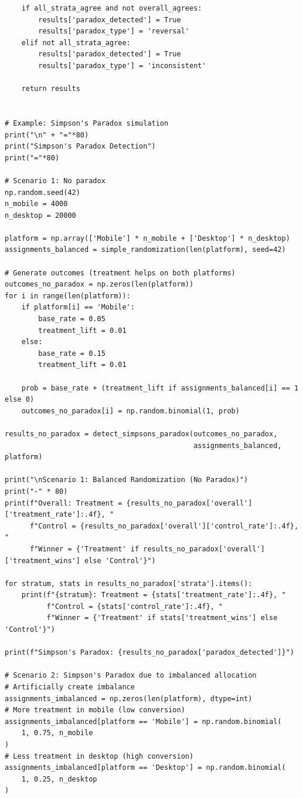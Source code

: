 \begin{lstlisting}
    if all_strata_agree and not overall_agrees:
        results['paradox_detected'] = True
        results['paradox_type'] = 'reversal'
    elif not all_strata_agree:
        results['paradox_detected'] = True
        results['paradox_type'] = 'inconsistent'

    return results


# Example: Simpson's Paradox simulation
print("\n" + "="*80)
print("Simpson's Paradox Detection")
print("="*80)

# Scenario 1: No paradox
np.random.seed(42)
n_mobile = 4000
n_desktop = 20000

platform = np.array(['Mobile'] * n_mobile + ['Desktop'] * n_desktop)
assignments_balanced = simple_randomization(len(platform), seed=42)

# Generate outcomes (treatment helps on both platforms)
outcomes_no_paradox = np.zeros(len(platform))
for i in range(len(platform)):
    if platform[i] == 'Mobile':
        base_rate = 0.05
        treatment_lift = 0.01
    else:
        base_rate = 0.15
        treatment_lift = 0.01

    prob = base_rate + (treatment_lift if assignments_balanced[i] == 1 else 0)
    outcomes_no_paradox[i] = np.random.binomial(1, prob)

results_no_paradox = detect_simpsons_paradox(outcomes_no_paradox,
                                             assignments_balanced, platform)

print("\nScenario 1: Balanced Randomization (No Paradox)")
print("-" * 80)
print(f"Overall: Treatment = {results_no_paradox['overall']['treatment_rate']:.4f}, "
      f"Control = {results_no_paradox['overall']['control_rate']:.4f}, "
      f"Winner = {'Treatment' if results_no_paradox['overall']['treatment_wins'] else 'Control'}")

for stratum, stats in results_no_paradox['strata'].items():
    print(f"{stratum}: Treatment = {stats['treatment_rate']:.4f}, "
          f"Control = {stats['control_rate']:.4f}, "
          f"Winner = {'Treatment' if stats['treatment_wins'] else 'Control'}")

print(f"Simpson's Paradox: {results_no_paradox['paradox_detected']}")

# Scenario 2: Simpson's Paradox due to imbalanced allocation
# Artificially create imbalance
assignments_imbalanced = np.zeros(len(platform), dtype=int)
# More treatment in mobile (low conversion)
assignments_imbalanced[platform == 'Mobile'] = np.random.binomial(
    1, 0.75, n_mobile
)
# Less treatment in desktop (high conversion)
assignments_imbalanced[platform == 'Desktop'] = np.random.binomial(
    1, 0.25, n_desktop
)


\end{lstlisting}
